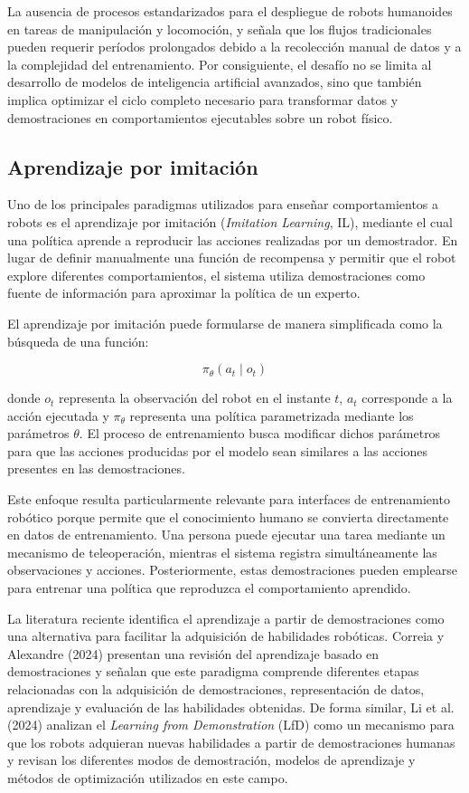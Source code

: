 \documentclass[stu,12pt,floatsintext]{apa7}
\begin{document}
La ausencia de procesos estandarizados para el despliegue de robots humanoides en tareas de manipulación y locomoción, y señala que los flujos tradicionales pueden requerir períodos prolongados debido a la recolección manual de datos y a la complejidad del entrenamiento. Por consiguiente, el desafío no se limita al desarrollo de modelos de inteligencia artificial avanzados, sino que también implica optimizar el ciclo completo necesario para transformar datos y demostraciones en comportamientos ejecutables sobre un robot físico.

\subsection{Aprendizaje por imitación}

Uno de los principales paradigmas utilizados para enseñar comportamientos a robots es el aprendizaje por imitación (\textit{Imitation Learning}, IL), mediante el cual una política aprende a reproducir las acciones realizadas por un demostrador. En lugar de definir manualmente una función de recompensa y permitir que el robot explore diferentes comportamientos, el sistema utiliza demostraciones como fuente de información para aproximar la política de un experto.

El aprendizaje por imitación puede formularse de manera simplificada como la búsqueda de una función:

\begin{equation}
\pi_{\theta}(a_t \mid o_t)
\end{equation}

donde $o_t$ representa la observación del robot en el instante $t$, $a_t$ corresponde a la acción ejecutada y $\pi_{\theta}$ representa una política parametrizada mediante los parámetros $\theta$. El proceso de entrenamiento busca modificar dichos parámetros para que las acciones producidas por el modelo sean similares a las acciones presentes en las demostraciones.

Este enfoque resulta particularmente relevante para interfaces de entrenamiento robótico porque permite que el conocimiento humano se convierta directamente en datos de entrenamiento. Una persona puede ejecutar una tarea mediante un mecanismo de teleoperación, mientras el sistema registra simultáneamente las observaciones y acciones. Posteriormente, estas demostraciones pueden emplearse para entrenar una política que reproduzca el comportamiento aprendido.

La literatura reciente identifica el aprendizaje a partir de demostraciones como una alternativa para facilitar la adquisición de habilidades robóticas. Correia y Alexandre (2024) presentan una revisión del aprendizaje basado en demostraciones y señalan que este paradigma comprende diferentes etapas relacionadas con la adquisición de demostraciones, representación de datos, aprendizaje y evaluación de las habilidades obtenidas. De forma similar, Li et al. (2024) analizan el \textit{Learning from Demonstration} (LfD) como un mecanismo para que los robots adquieran nuevas habilidades a partir de demostraciones humanas y revisan los diferentes modos de demostración, modelos de aprendizaje y métodos de optimización utilizados en este campo.
\end{document}

